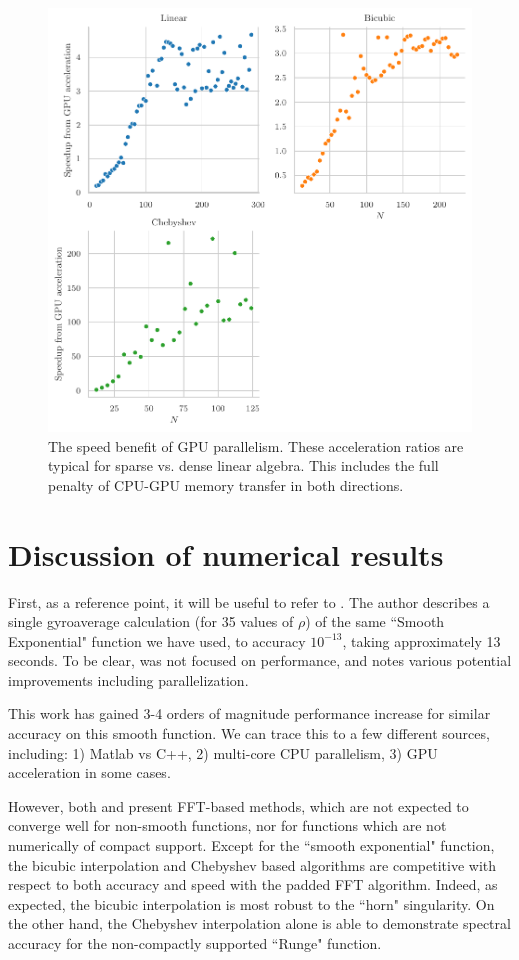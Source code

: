 	\begin{figure}[htbp!]
	\includegraphics[scale=1]{GPUAccel.pdf}	
	\caption[The benefit from GPU acceleration]{The speed benefit of GPU parallelism.  These acceleration ratios are typical for sparse vs. dense linear algebra.  This includes the full penalty of CPU-GPU memory transfer in both directions.}  	\end{figure}

	
	\section{Discussion of numerical results}  First, as a reference point, it will be useful to refer to \cite[P. 16]{guadagniThesis}.  The author describes a single gyroaverage calculation (for 35 values of $\rho$) of the same ``Smooth Exponential" function we have used, to accuracy $10^{-13}$, taking approximately 13 seconds.  To be clear, \cite{guadagniThesis} was not focused on performance, and notes various potential improvements including parallelization.  
	
	This work has gained 3-4 orders of magnitude performance increase for similar accuracy on this smooth function.  We can trace this to a few different sources, including:  1) Matlab vs C++, 2) multi-core CPU parallelism, 3) GPU acceleration in some cases.
	
	However, both \cite{gorner2012} and \cite{guadagniThesis} present FFT-based methods, which are not expected to converge well for non-smooth functions, nor for functions which are not numerically of compact support.  Except for the ``smooth exponential" function, the bicubic interpolation and Chebyshev based algorithms are competitive with respect to both accuracy and speed with the padded FFT algorithm.  Indeed, as expected, the bicubic interpolation is most robust to the ``horn" singularity.  On the other hand, the Chebyshev interpolation alone is able to demonstrate spectral accuracy for the non-compactly supported ``Runge" function.





